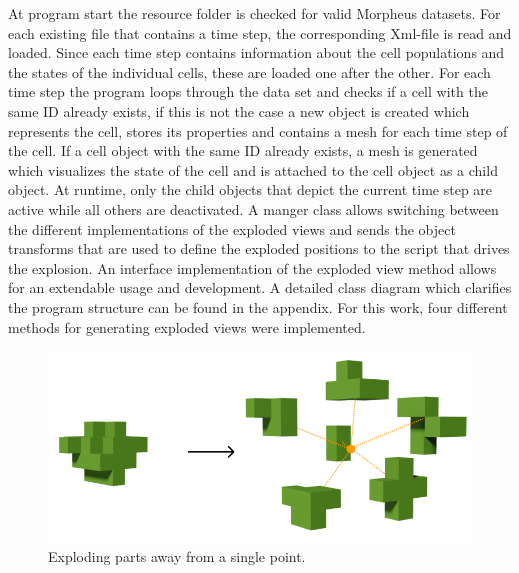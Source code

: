 At program start the resource folder is checked for valid Morpheus datasets.
For each existing file that contains a time step, the corresponding Xml-file is read and loaded. 
Since each time step contains information about the cell populations and the states of the individual cells, these are loaded one after the other.
For each time step the program loops through the data set and checks if a cell with the same ID already exists, if this is not the case a new object is created which represents the cell, stores its properties and contains a mesh for each time step of the cell. 
If a cell object with the same ID already exists, a mesh is generated which visualizes the state of the cell and is attached to the cell object as a child object.
At runtime, only the child objects that depict the current time step are active while all others are deactivated.
A manger class allows switching between the different implementations of the exploded views and sends the object transforms that are used to define the exploded positions to the script that drives the explosion. 
An interface implementation of the exploded view method allows for an extendable usage and development. 
A detailed class diagram which clarifies the program structure can be found in the appendix. %
For this work, four different methods for generating exploded views were implemented.

\begin{figure}[h]
	\centering
	\includegraphics[width=.65\linewidth]{fig/Images/PointExplosion}
	\caption[]{Exploding parts away from a single point.}
	\label{fig:pointExpl1}
\end{figure}

